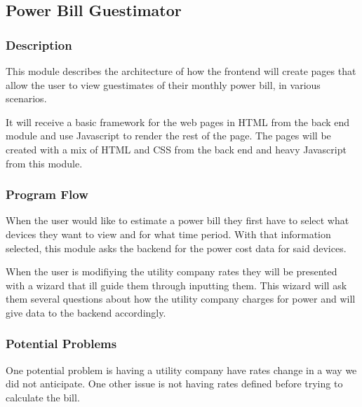 
\subsection{Power Bill Guestimator}

\subsubsection{Description}

This module describes the architecture of how the frontend will create pages that allow the user to view guestimates of their monthly power bill, in various scenarios.

It will receive a basic framework for the web pages in \ac{HTML} from the back end module and use Javascript to render the rest of the page. 
The pages will be created with a mix of \ac{HTML} and \ac{CSS} from the back end and heavy Javascript from this module. 

\subsubsection{Program Flow}

When the user would like to estimate a power bill they first have to select what devices they want to view and for what time period.
With that information selected, this module asks the backend for the power cost data for said devices.

When the user is modifiying the utility company rates they will be presented with a wizard that ill guide them through inputting them.
This wizard will ask them several questions about how the utility company charges for power and will give data to the backend accordingly.


\subsubsection{Potential Problems}

One potential problem is having a utility company have rates change in a way we did not anticipate.
One other issue is not having rates defined before trying to calculate the bill.
